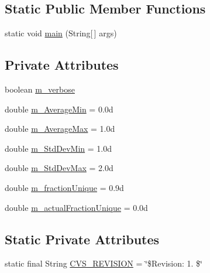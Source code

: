 \subsection*{Static Public Member Functions}
\begin{DoxyCompactItemize}
\item 
static void \hyperlink{classorg_1_1jgap_1_1util_1_1_test_hashcode_ab61a6696c7db9342aab2b0edfb1d328e}{main} (String\mbox{[}$\,$\mbox{]} args)
\end{DoxyCompactItemize}
\subsection*{Private Attributes}
\begin{DoxyCompactItemize}
\item 
boolean \hyperlink{classorg_1_1jgap_1_1util_1_1_test_hashcode_ad23c284a29777b3928ae126657bb0cb9}{m\-\_\-verbose}
\item 
double \hyperlink{classorg_1_1jgap_1_1util_1_1_test_hashcode_abfb003e9bfca7edd80c68823024178d5}{m\-\_\-\-Average\-Min} = 0.\-0d
\item 
double \hyperlink{classorg_1_1jgap_1_1util_1_1_test_hashcode_a0d91cff36298abbb9761e0a864b79df9}{m\-\_\-\-Average\-Max} = 1.\-0d
\item 
double \hyperlink{classorg_1_1jgap_1_1util_1_1_test_hashcode_a1601b935a90e3905a6107d9b88bbb47a}{m\-\_\-\-Std\-Dev\-Min} = 1.\-0d
\item 
double \hyperlink{classorg_1_1jgap_1_1util_1_1_test_hashcode_a8c500454e1a3728534cc3c0c5f848b52}{m\-\_\-\-Std\-Dev\-Max} = 2.\-0d
\item 
double \hyperlink{classorg_1_1jgap_1_1util_1_1_test_hashcode_aae2f2be35f516f8a9f75141267f43d49}{m\-\_\-fraction\-Unique} = 0.\-9d
\item 
double \hyperlink{classorg_1_1jgap_1_1util_1_1_test_hashcode_a50fe2fcbfefbc22be87b0f486e00dd09}{m\-\_\-actual\-Fraction\-Unique} = 0.\-0d
\end{DoxyCompactItemize}
\subsection*{Static Private Attributes}
\begin{DoxyCompactItemize}
\item 
static final String \hyperlink{classorg_1_1jgap_1_1util_1_1_test_hashcode_a4888cc10337eb1d4c0225c7f0ff2d7ed}{C\-V\-S\-\_\-\-R\-E\-V\-I\-S\-I\-O\-N} = \char`\"{}\$Revision\-: 1. \$\char`\"{}
\end{DoxyCompactItemize}



